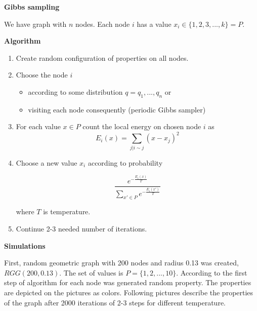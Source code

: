 \documentclass[12pt]{report}
\begin{document}
\textbf{Gibbs sampling} 

We have graph with $n$ nodes. Each node $i$ has a value $x_i \in \lbrace 1, 2, 3, ..., k \rbrace = P$. 


\textbf{Algorithm} 

\begin{enumerate}
  \item Create random configuration of properties on all nodes.
  \item Choose the node $i$
  
 	 \begin{itemize}
		\item according to some distribution $q = q_1, ..., q_n$ or
		\item visiting each node consequently (periodic Gibbs sampler)
 	 \end{itemize}
  
  \item For each value $x \in P$ count the local energy on chosen node $i$ as 
  $$ E_i(x) = \sum\limits_{j | i \sim j}  (x - x_j)^2 $$  
  
  \item Choose a new value $x_i$ according to probability
  
  $$ \frac{ e^{-\frac{E_i(x)}{T}} }{ \sum\limits_{x'\in P} e^{-\frac{E_i(x')}{T}}} $$
  
	where $T$ is temperature.
\item Continue 2-3 needed number of iterations.
\end{enumerate}


\textbf{Simulations}

First, random geometric graph with 200 nodes and radius 0.13 was created, $RGG(200, 0.13)$. The set of values is $P = \lbrace 1, 2, ..., 10 \rbrace$. According to the first step of algorithm for each node was generated random property. The properties are depicted on the pictures as colors. Following pictures describe the properties of the graph after 2000 iterations of 2-3 steps for different temperature.
\end{document}
